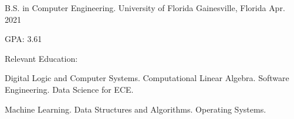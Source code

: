 


\begin{cventries}


\cventry
{B.S. in Computer Engineering.} %
{University of Florida} %
{Gainesville, Florida} %
{Apr. 2021} %
{ %
\begin{cvitems}
\item {GPA: 3.61}
\item Relevant Education:
\setlength{\itemindent}{.125in}
\item {Digital Logic and Computer Systems. Computational Linear Algebra. Software Engineering. Data Science for ECE.}
\item {Machine Learning. Data Structures and Algorithms. Operating Systems.}
\end{cvitems}
}


\end{cventries}
